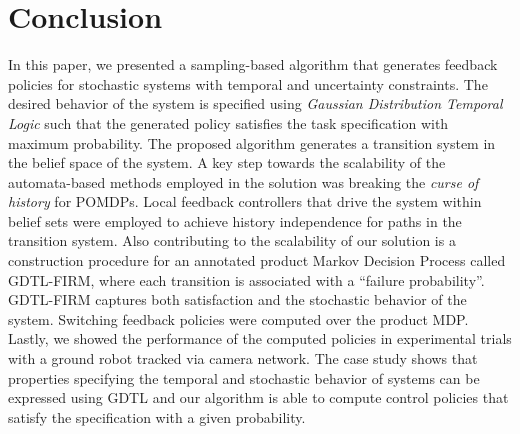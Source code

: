\section{Conclusion}
\label{sec:conclusion}

In this paper, we presented a sampling-based algorithm that
generates feedback policies for stochastic systems with
temporal and uncertainty constraints.
The desired behavior of the system is specified using
{\em Gaussian Distribution Temporal Logic}
such that the generated policy satisfies the task
specification with maximum probability.
The proposed algorithm generates a transition system
in the belief space of the system.
A key step towards the scalability of the automata-based
methods employed in the solution
was breaking the {\em curse of history} for POMDPs.
Local feedback controllers that drive the system within
belief sets were employed to achieve history independence
for paths in the transition system.
Also contributing
to the scalability
of our solution is a construction procedure for an annotated
product Markov Decision Process called GDTL-FIRM,
where each transition is associated with a ``failure probability''.
GDTL-FIRM captures both satisfaction and the stochastic
behavior of the system.
Switching feedback policies were computed over the product MDP.
Lastly, we showed the performance of the computed policies in
experimental trials with a ground robot %
tracked via
camera network.
%
The case study %
shows that properties specifying
the temporal and stochastic behavior of systems can be
expressed using GDTL and our algorithm is able to
compute control policies that satisfy the %
specification with a given probability.

